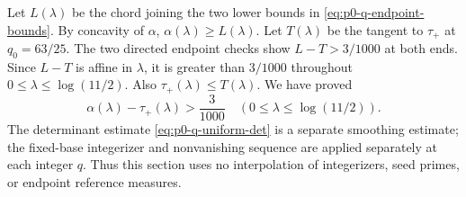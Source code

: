 Let $L(\lambda)$ be the chord joining the two lower bounds in
\eqref{eq:p0-q-endpoint-bounds}.  By concavity of $\alpha$,
$\alpha(\lambda)\ge L(\lambda)$.  Let $T(\lambda)$ be the tangent to
$\tau_+$ at $q_0=63/25$.  The two directed endpoint checks show
$L-T>3/1000$ at both ends.  Since $L-T$ is affine in $\lambda$, it is
greater than $3/1000$ throughout
$0\le\lambda\le\log(11/2)$.  Also $\tau_+(\lambda)\le T(\lambda)$.
We have proved
\begin{equation}\label{eq:p0-q-positive-margin}
 \alpha(\lambda)-\tau_+(\lambda)>\frac3{1000}
                 \quad(0\le\lambda\le\log(11/2)).
\end{equation}
The determinant estimate \eqref{eq:p0-q-uniform-det} is a separate
smoothing estimate; the fixed-base integerizer and nonvanishing sequence are
applied separately at each integer $q$.  Thus this section uses
no interpolation of integerizers, seed primes, or endpoint reference
measures.

